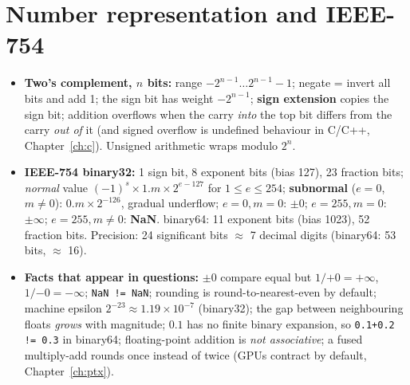 \documentclass[10pt,a4paper,openany,oneside]{report}
\newcommand{\prio}[1]{\texorpdfstring{\ifcase#1\or{\color{gold}\ding{72}}\or{\color{gold}\ding{72}\ding{72}}\or{\color{gold}\ding{72}\ding{72}\ding{72}}\fi}{}}
\begin{document}
\section{Number representation and IEEE-754 \prio{3}}
\begin{mustbox}
\begin{itemize}[nosep]
\item \textbf{Two's complement, $n$ bits:} range $-2^{n-1}\ldots2^{n-1}-1$; negate = invert all bits and add 1; the sign bit has weight $-2^{n-1}$; \textbf{sign extension} copies the sign bit; addition overflows when the carry \emph{into} the top bit differs from the carry \emph{out of} it (and signed overflow is undefined behaviour in C/C++, Chapter~\ref{ch:c}). Unsigned arithmetic wraps modulo $2^n$.
\item \textbf{IEEE-754 binary32:} 1 sign bit, 8 exponent bits (bias 127), 23 fraction bits; \emph{normal} value $(-1)^s\times1.m\times2^{e-127}$ for $1\le e\le254$; \textbf{subnormal} ($e=0$, $m\ne0$): $0.m\times2^{-126}$, gradual underflow; $e=0,m=0$: $\pm0$; $e=255,m=0$: $\pm\infty$; $e=255,m\ne0$: \textbf{NaN}. binary64: 11 exponent bits (bias 1023), 52 fraction bits. Precision: 24 significant bits $\approx$ 7 decimal digits (binary64: 53 bits, $\approx$ 16).
\item \textbf{Facts that appear in questions:} $\pm0$ compare equal but $1/{+0}=+\infty$, $1/{-0}=-\infty$; \texttt{NaN != NaN}; rounding is round-to-nearest-even by default; machine epsilon $2^{-23}\approx1.19\times10^{-7}$ (binary32); the gap between neighbouring floats \emph{grows} with magnitude; $0.1$ has no finite binary expansion, so \texttt{0.1+0.2 != 0.3} in binary64; floating-point addition is \emph{not associative}; a fused multiply-add rounds once instead of twice (GPUs contract by default, Chapter~\ref{ch:ptx}).
\end{itemize}
\end{mustbox}
\end{document}

